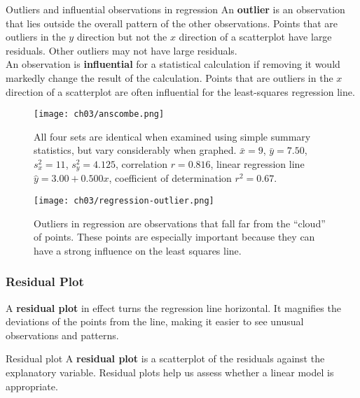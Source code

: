 \begin{definition}{Outliers and influential observations in regression}{}
    An \textbf{outlier} is an observation that lies outside the overall pattern of the other observations. Points that are outliers in the $y$ direction but not the $x$ direction of a scatterplot have large residuals. Other outliers may not have large residuals. \\
    An observation is \textbf{influential} for a statistical calculation if removing it would markedly change the result of the calculation. Points that are outliers in the $x$ direction of a scatterplot are often influential for the least-squares regression line.
\end{definition}

\begin{figure}[ht!]
    \centering
    \texttt{[image: ch03/anscombe.png]}
    \caption{All four sets are identical when examined using simple summary statistics, but vary considerably when graphed. $\bar{x} = 9$, $\bar{y} = 7.50$, $s_x^2 = 11$, $s_y^2 = 4.125$, correlation $r = 0.816$, linear regression line $\hat{y} = 3.00 + 0.500x$, coefficient of determination $r^2 = 0.67$.}
    \label{fig:anscombe}
\end{figure}

\begin{figure}[ht!]
    \centering
    \texttt{[image: ch03/regression-outlier.png]}
    \caption{Outliers in regression are observations that fall far from the ``cloud'' of points. These points are especially important because they can have a strong influence on the least squares line.}
    \label{fig:regression-outlier}
\end{figure}

\subsubsection{Residual Plot}

A \textbf{residual plot} in effect turns the regression line horizontal. It magnifies the deviations of the points from the line, making it easier to see unusual observations and patterns.

\begin{definition}{Residual plot}{}
    A \textbf{residual plot} is a scatterplot of the residuals against the explanatory variable. Residual plots help us assess whether a linear model is appropriate.
\end{definition}

